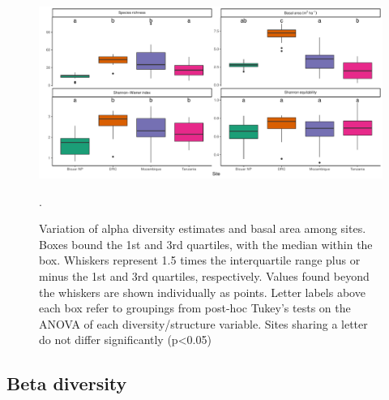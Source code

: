 \begin{refsection}
\begin{figure}
	\includegraphics[width=\linewidth]{img/div_box}
	\caption[Alpha diversity of plots within each site]{Variation of alpha diversity estimates and basal area among sites. Boxes bound the 1st and 3rd quartiles, with the median within the box. Whiskers represent 1.5 times the interquartile range plus or minus the 1st and 3rd quartiles, respectively. Values found beyond the whiskers are shown individually as points. Letter labels above each box refer to groupings from post-hoc Tukey's tests on the ANOVA of each diversity/structure variable. Sites sharing a letter do not differ significantly (p<0.05)}.
    \label{bicuar:div_box}
\end{figure}

\begin{landscape}

\end{landscape}

\subsection{Beta diversity}
\label{bicuar:ssec:beta}


\end{refsection}
